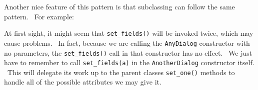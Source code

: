 
Another nice feature of this pattern is that subclassing can follow the
same pattern. \ For example:


At first sight, it might seem that \texttt{set\_fields()} will be
invoked twice, which may cause problems. \ In fact, because we are
calling the \texttt{AnyDialog} constructor with no parameters, the
\texttt{set\_fields()} call in that constructor has no effect. \ We
just have to remember to call \texttt{set\_fields(a)} in the
\texttt{AnotherDialog} constructor itself. \ This will delegate its
work up to the parent classes{\textquotesingle} \texttt{set\_one()}
methods to handle all of the possible attributes we may give it.

